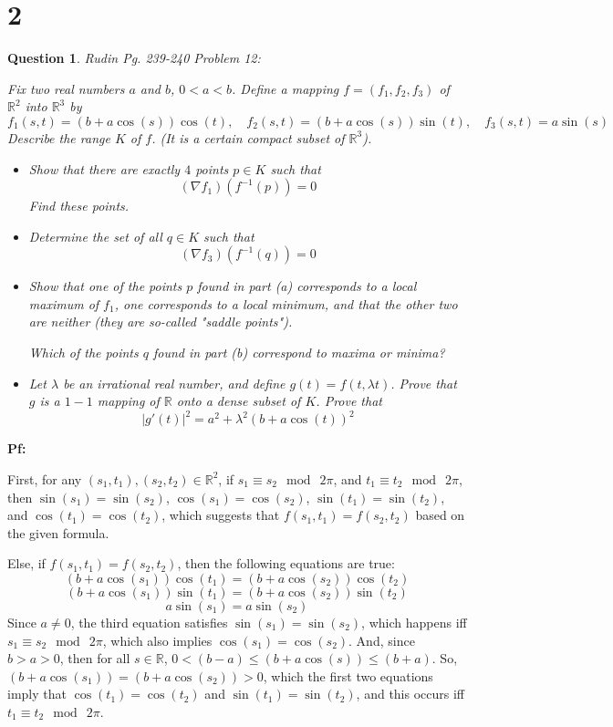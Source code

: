 \documentclass{article}
\newtheorem{question}{Question}
\begin{document}
\section*{2}
\begin{myBox}[]{}
    \begin{question}
        Rudin Pg. 239-240 Problem 12:

        Fix two real numbers $a$ and $b$, $0<a<b$. Define a mapping $f=(f_1,f_2,f_3)$ of $\mathbb{R}^2$ into $\mathbb{R}^3$ by 
        $$f_1(s,t)=(b+a\cos(s))\cos(t),\quad f_2(s,t)=(b+a\cos(s))\sin(t),\quad f_3(s,t)=a\sin(s)$$
        Describe the range $K$ of $f$. (It is a certain compact subset of $\mathbb{R}^3$).

        \begin{itemize}
            \item[(a)] Show that there are exactly $4$ points $p\in K$ such that 
            $$(\nabla f_1)(f^{-1}(p))=0$$
            Find these points.
            \item[(b)] Determine the set of all $q\in K$ such that 
            $$(\nabla f_3)(f^{-1}(q))=0$$
            \item[(c)] Show that one of the points $p$ found in part (a) corresponds to a local maximum of $f_1$, one corresponds to a local minimum, and that the other two are neither (they are so-called "saddle points").
            
            Which of the points $q$ found in part (b) correspond to maxima or minima?
            \item[(d)] Let $\lambda$ be an irrational real number, and define $g(t)=f(t,\lambda t)$. Prove that $g$ is a $1-1$ mapping of $\mathbb{R}$ onto a dense subset of $K$. Prove that
            $$|g'(t)|^2 = a^2+\lambda^2(b+a\cos(t))^2$$
        \end{itemize}
    \end{question}
\end{myBox}

\textbf{Pf:}

First, for any $(s_1,t_1), (s_2,t_2)\in\mathbb{R}^2$, if $s_1\equiv s_2\mod\ 2\pi$, and $t_1\equiv t_2\mod\ 2\pi$, then $\sin(s_1)=\sin(s_2)$, $\cos(s_1)=\cos(s_2)$, $\sin(t_1)=\sin(t_2)$, and $\cos(t_1)=\cos(t_2)$,
which suggests that $f(s_1,t_1)=f(s_2,t_2)$ based on the given formula.

Else, if $f(s_1,t_1)=f(s_2,t_2)$, then the following equations are true:
$$(b+a\cos(s_1))\cos(t_1)=(b+a\cos(s_2))\cos(t_2)$$
$$(b+a\cos(s_1))\sin(t_1)=(b+a\cos(s_2))\sin(t_2)$$
$$a\sin(s_1)=a\sin(s_2)$$
Since $a\neq 0$, the third equation satisfies $\sin(s_1)=\sin(s_2)$, which happens iff $s_1\equiv s_2\mod\ 2\pi$, which also implies $\cos(s_1)=\cos(s_2)$.
And, since $b>a>0$, then for all $s\in\mathbb{R}$, $0<(b-a)\leq(b+a\cos(s))\leq (b+a)$. So, $(b+a\cos(s_1))=(b+a\cos(s_2))>0$,
which the first two equations imply that $\cos(t_1)=\cos(t_2)$ and $\sin(t_1)=\sin(t_2)$, and this occurs iff $t_1 \equiv t_2\mod\ 2\pi$.
\end{document}
